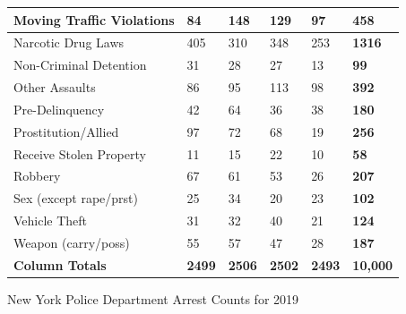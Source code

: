 \documentclass{article}
\begin{document}
\begin{table}[h!]
\begin{tabular}{|l|l|l|l|l|l|}
Moving Traffic Violations      & 84            & 148            & 129             & 97            & \textbf{458}        \\ \hline
Narcotic Drug Laws             & 405           & 310            & 348             & 253           & \textbf{1316}       \\ \hline
Non-Criminal Detention         & 31            & 28             & 27              & 13            & \textbf{99}         \\ \hline
Other Assaults                 & 86            & 95             & 113             & 98            & \textbf{392}        \\ \hline
Pre-Delinquency                & 42            & 64             & 36              & 38            & \textbf{180}        \\ \hline
Prostitution/Allied            & 97            & 72             & 68              & 19            & \textbf{256}        \\ \hline
Receive Stolen Property        & 11            & 15             & 22              & 10            & \textbf{58}         \\ \hline
Robbery                        & 67            & 61             & 53              & 26            & \textbf{207}        \\ \hline
Sex (except rape/prst)         & 25            & 34             & 20              & 23            & \textbf{102}        \\ \hline
Vehicle Theft                  & 31            & 32             & 40              & 21            & \textbf{124}        \\ \hline
Weapon (carry/poss)            & 55            & 57             & 47              & 28            & \textbf{187}        \\ \hline
\textbf{Column Totals}         & \textbf{2499} & \textbf{2506}  & \textbf{2502}   & \textbf{2493} & \textbf{10,000}     \\ \hline
\end{tabular}
\end{table}




\newpage
\begin{center}
    New York Police Department Arrest Counts for 2019
\end{center}
\end{document}
